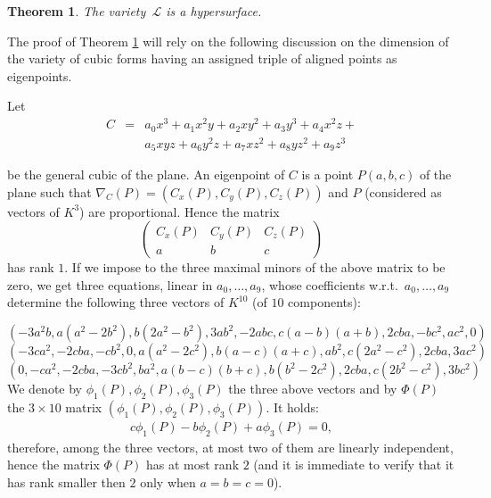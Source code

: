 \documentclass{amsart}
\theoremstyle{plain}
\newtheorem{theorem}{Theorem}[section]
\theoremstyle{definition}
\begin{document}
\begin{theorem}\label{thm: dimension of L}
The variety~$\mathcal{L}$ is a hypersurface.
\end{theorem}


The proof of Theorem \ref{thm: dimension of L} will rely on the following discussion on the dimension of 
the variety of cubic forms having an assigned triple of aligned points as eigenpoints.

Let
\begin{equation}
  \begin{array}{lcr}
  C &=& a_0x^3 + a_1x^2y + a_2xy^2 + a_3y^3 + a_4x^2z +\\
  & & a_5xyz + a_6y^2z + a_7xz^2 + a_8yz^2 + a_9z^3
  \end{array}
    \label{cubicaGen}
\end{equation}

be the general cubic of the plane. An eigenpoint of $C$ is a point
$P(a, b, c)$ of the plane such that $\nabla_C(P) =
\left(C_x(P), C_y(P), C_z(P)\right)$
and $P$ (considered as
vectors of $K^3$) are proportional.  Hence the matrix
\[ \left(
\begin{array}{ccc}
  C_x(P) & C_y(P) & C_z(P) \\
  a & b& c
\end{array}
\right)
\]
has rank $1$. 
If we impose to the three maximal minors of the above matrix to be zero,
we get three equations, linear in 
$a_0, \dots, a_9$, whose coefficients  w.r.t.\
$a_0, \dots, a_9$ 
determine the following three vectors of $K^{10}$ (of $10$ components):

{\small
\[(-3a^2b, a(a^2 - 2b^2), b(2a^2 - b^2), 3ab^2,
 -2abc, c(a - b)(a + b), 2  c  b  a,
 -b  c^2, a  c^2, 0)
\]
\[
(-3ca^2,
-2cba,
-cb^2,
0,
a(a^2-2c^2),
b(a-c)(a+c),
ab^2,
c(2a^2-c^2),
2cba,
3ac^2)
\]
\[
(0,
-ca^2,
-2cba,
-3cb^2,
ba^2,
a(b-c)(b+c),
b(b^2-2c^2),
2cba,
c(2b^2-c^2),
3bc^2)
\]
}
We denote by  $\phi_1(P), \phi_2(P), \phi_3(P)$ the three above vectors
and by $\Phi(P)$ the $3\times 10$ matrix $(\phi_1(P), \phi_2(P), \phi_3(P))$.
It holds:
\begin{eqnarray}
  c\phi_1(P)-b\phi_2(P)+a\phi_3(P) = 0,
  \label{eqBase}
\end{eqnarray}
therefore,
among the three vectors, at most two of them are linearly independent,
hence the matrix $\Phi(P)$ has at most rank $2$ (and it is immediate to
verify that it has rank smaller then $2$ only when $a=b=c=0$).
\end{document}
